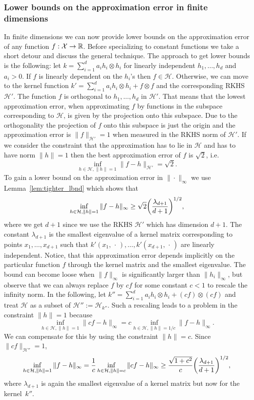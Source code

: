 \documentclass[10pt]{amsart}
\theoremstyle{definition}\newtheorem{defi}[theo]{Definition}\newtheorem{rema}[theo]{Remark}\newtheorem{exam}[theo]{Example}\newtheorem{exem}[theo]{Example}\newtheorem{nota}[theo]{Notation}
\theoremstyle{remark}
\newcommand{\R}{\mathbb{R}}
\newcommand{\X}{\mathcal{X}}
\newcommand{\cH}{\mathcal{H}}
\renewcommand*{\to}{\mathchoice{\longrightarrow}{\rightarrow}{\rightarrow}{\rightarrow}}
\let\originalleft\left
\let\originalright\right
\renewcommand{\left}{\mathopen{}\mathclose\bgroup\originalleft}
\renewcommand{\right}{\aftergroup\egroup\originalright}
\begin{document}
\subsubsection{Lower bounds on the approximation error in finite dimensions} \label{sec:finite_dim_appox_LB}
In finite dimensions we can now provide lower bounds on the approximation error of any function $f:\X \to \R$. Before specializing to constant functions we take a short detour and discuss the general technique. The approach to get lower bounds is the following: let $k = \sum_{i=1}^d a_i h_i \otimes h_i$ for linearly independent $h_1,\dots, h_d$ and $a_i>0$. If $f$ is linearly dependent on the $h_i$'s then $f \in \cH$. Otherwise, we can move to the kernel function $k' = \sum_{i=1}^d a_i h_i\otimes h_i + f\otimes f$ and the corresponding RKHS $\cH'$. The function $f$ is orthogonal to $h_1,\dots, h_d$ in $\cH'$. That means that the lowest approximation error, when approximating $f$ by functions in the subspace corresponding to $\cH$, is given by the projection onto this subspace. Due to the orthogonality the projection of $f$ onto this subspace is just the origin and the approximation error is $\|f\|_{\cH'} = 1$ when measured in the RKHS norm of $\cH'$. If we consider the constraint that the approximation has to lie in $\cH$ and has to have norm $\|h\| =1 $ then the best approximation error of $f$ is $\sqrt{2}$, i.e.
\[
\inf_{h \in \cH, \|h\|=1} \|f-h\|_{\cH'} = \sqrt{2}.
\]
To gain a lower bound on the approximation error in $\|\cdot\|_\infty$ we use Lemma~\ref{lem:tighter_lbnd} which shows that
\[
\inf_{h\in \cH, \|h\|=1} \|f-h\|_\infty \geq \sqrt{2} \left(\frac{\lambda_{d+1}}{d+1}\right)^{1/2},
\]
where we get $d+1$ since we use the RKHS $\cH'$ which has dimension $d+1$. The constant $\lambda_{d+1}$ is the smallest eigenvalue of a kernel matrix corresponding to points $x_1,\dots, x_{d+1}$ such that $k'(x_1,\,\cdot\,),\dots, k'(x_{d+1}, \,\cdot\,)$ are linearly independent. Notice, that this approximation error depends implicitly on the particular function $f$ through the kernel matrix and the smallest eigenvalue. The bound can become loose when $\|f\|_\infty$ is significantly larger than $\|h_i\|_\infty$, but observe that we can always replace $f$ by $cf$ for some constant $c<1$ to rescale the infinity norm. In the following, let $k'' = \sum_{i=1}^d a_i h_i\otimes h_i + (cf)\otimes (cf)$ and treat $\cH$ as a subset of $\cH'' := \cH_{k''}$. Such a rescaling leads to a problem in the constraint $\|h\|=1$ because
\[
\inf_{h\in \cH, \|h\|=1} \|cf-h\|_\infty = c \inf_{h\in \cH, \|h\|=1/c} \|f-h\|_\infty.
\]
We can compensate for this by using the constraint $\|h\| = c$. Since $\|cf\|_{\cH''} = 1$,
\[
\inf_{h\in \cH, \|h\|=1} \|f-h\|_\infty = \frac{1}{c} \inf_{h\in \cH, \|h\|=c} \|cf- h\|_\infty \geq \frac{\sqrt{1 + c^2}}{c} \left(\frac{\lambda_{d+1}}{d+1}\right)^{1/2},
\]
where $\lambda_{d+1}$ is again the smallest eigenvalue of a kernel matrix but now for the kernel~$k''$.
\end{document}
